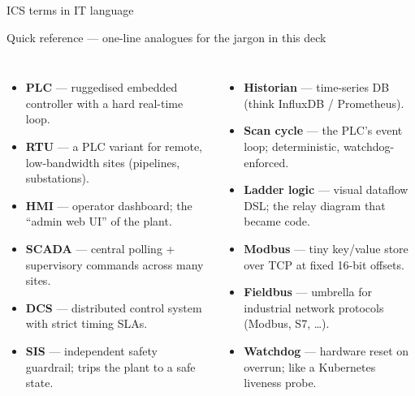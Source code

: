 \documentclass[aspectratio=169,11pt]{beamer}
\begin{document}
\sectionoverviewframe


\begin{frame}{ICS terms in IT language}
\begin{defbox}{Quick reference --- one-line analogues for the jargon in this deck}
\begin{columns}[T,onlytextwidth]
\scriptsize
\begin{itemize}\setlength{\itemsep}{1.5pt}
  \item \textbf{PLC} --- ruggedised embedded controller with a hard real-time loop.
  \item \textbf{RTU} --- a PLC variant for remote, low-bandwidth sites (pipelines, substations).
  \item \textbf{HMI} --- operator dashboard; the ``admin web UI'' of the plant.
  \item \textbf{SCADA} --- central polling + supervisory commands across many sites.
  \item \textbf{DCS} --- distributed control system with strict timing SLAs.
  \item \textbf{SIS} --- independent safety guardrail; trips the plant to a safe state.
\end{itemize}
\scriptsize
\begin{itemize}\setlength{\itemsep}{1.5pt}
  \item \textbf{Historian} --- time-series DB (think InfluxDB / Prometheus).
  \item \textbf{Scan cycle} --- the PLC's event loop; deterministic, watchdog-enforced.
  \item \textbf{Ladder logic} --- visual dataflow DSL; the relay diagram that became code.
  \item \textbf{Modbus} --- tiny key/value store over TCP at fixed 16-bit offsets.
  \item \textbf{Fieldbus} --- umbrella for industrial network protocols (Modbus, S7, \dots).
  \item \textbf{Watchdog} --- hardware reset on overrun; like a Kubernetes liveness probe.
\end{itemize}
\end{columns}
\end{defbox}
\end{frame}
\end{document}
